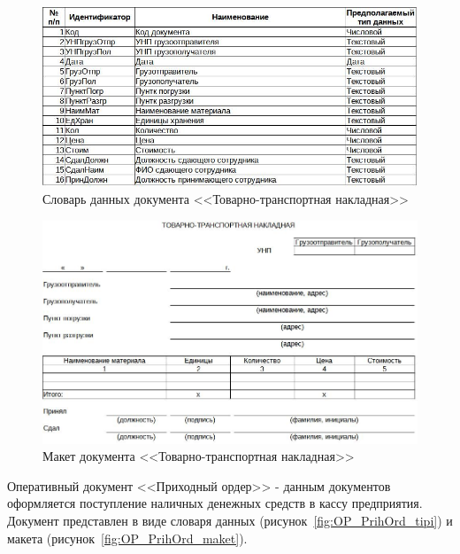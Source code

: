 \documentclass[12pt, a4paper, simple]{eskdtext}
\begin{document}
    \begin{figure}[!h]
        \centering
        \includegraphics[width=14cm]
            {_docs/ОП_ТТН_типы.jpg}
        \caption{Словарь данных документа <<Товарно-транспортная накладная>>}
        \label{fig:OP_TTH_tipi}
    \end{figure}

    \begin{figure}[!h]
        \centering
        \includegraphics[width=14cm]
            {_docs/ОП_ТТН_макет.jpg}
        \caption{Макет документа <<Товарно-транспортная накладная>>}
        \label{fig:OP_TTH_maket}
    \end{figure}

    \newpage

    Оперативный документ <<Приходный ордер>> - данным документов оформляется
    поступление наличных денежных средств в кассу предприятия.
    Документ представлен в виде словаря данных (рисунок~\ref{fig:OP_PrihOrd_tipi})
    и макета (рисунок~\ref{fig:OP_PrihOrd_maket}).
\end{document}
